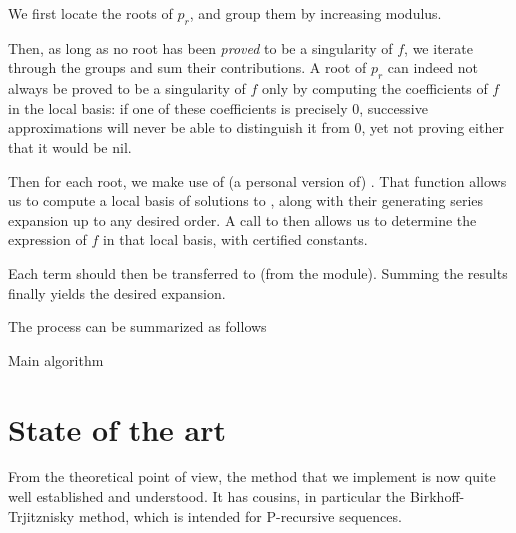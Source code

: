 \documentclass[../main.tex]{subfiles}
\begin{document}
We first locate the roots of $p_r$, and group them by increasing modulus.

Then, as long as no root has been \textit{proved} to be a singularity of $f$, we iterate through the groups and sum their contributions. A root of $p_r$ can indeed not always be proved to be a singularity of $f$ only by computing the coefficients of $f$ in the local basis: if one of these coefficients is precisely 0, successive approximations will never be able to distinguish it from 0, yet not proving either that it would be nil.

Then for each root, we make use of (a personal version of) . That function allows us to compute a local basis of solutions to , along with their generating series expansion up to any desired order. A call to  then allows us to determine the expression of $f$ in that local basis, with certified constants.

Each term should then be transferred to  (from the  module). Summing the results finally yields the desired expansion.

The process can be summarized as follows

\begin{algorithm}[H]
	\caption{Main algorithm}
	\SetAlgoLined
	
\end{algorithm}


\section{State of the art}

From the theoretical point of view, the method that we implement is now quite well established and understood. It has cousins, in particular the Birkhoff-Trjitznisky method, which is intended for P-recursive sequences.
\end{document}
